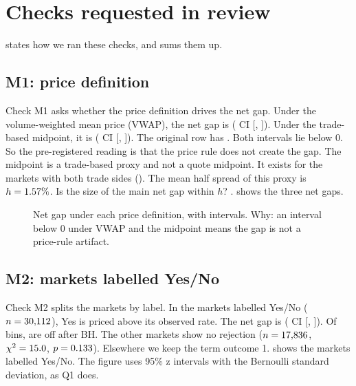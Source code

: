 \section{Checks requested in review}\label{sec:res-review}
 states how we ran these checks, and  sums them up.

\subsection{M1: price definition}\label{sec:app-m1}
Check M1 asks whether the price definition drives the net gap.
Under the volume-weighted mean price (VWAP), the net gap is \RThreeMOneVwapNetGap{} (\CiLevel{} CI [\RThreeMOneVwapNetGapCiLow, \RThreeMOneVwapNetGapCiHigh]).
Under the trade-based midpoint, it is \RThreeMOneMidNetGap{} (\CiLevel{} CI [\RThreeMOneMidNetGapCiLow, \RThreeMOneMidNetGapCiHigh]).
The original row has \GapNetDiffMain.
Both intervals lie below 0.
So the pre-registered reading is that the price rule does not create the gap.
The midpoint is a trade-based proxy and not a quote midpoint.
It exists for the \RThreeMOneMidN{} markets with both trade sides (\RThreeMOneShareBoth).
The mean half spread of this proxy is $h=1.57\%$.
Is the size of the main net gap within $h$? \RThreeMOneGapWithinHalfSpread.
 shows the three net gaps.

\begin{figure}[H]
\centering
{}
\caption{Net gap under each price definition, with \CiLevel{} intervals. Why: an interval below 0 under VWAP and the midpoint means the gap is not a price-rule artifact.}%
\label{fig:r3-m1}
\end{figure}

\subsection{M2: markets labelled Yes/No}\label{sec:app-m2}
Check M2 splits the markets by label.
In the markets labelled Yes/No ($n=30{,}112$), Yes is priced above its observed rate.
The net gap is \RThreeMTwoYesNoNetGap{} (\CiLevel{} CI [\RThreeMTwoYesNoNetGapCiLow, \RThreeMTwoYesNoNetGapCiHigh]).
Of \NBins{} bins, \RThreeMTwoYesNoBinsBh{} are off after BH.
The other markets show no rejection ($n=17{,}836$, $\chi^2=15.0$, $p=0.133$).
Elsewhere we keep the term outcome 1.
 shows the markets labelled Yes/No.
The figure uses 95\% z intervals with the Bernoulli standard deviation, as Q1 does.

